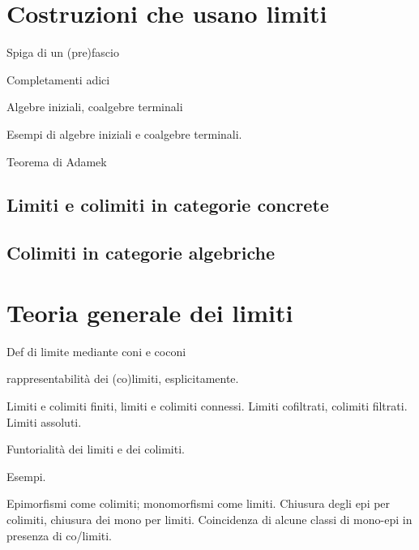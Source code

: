 \section{Costruzioni che usano limiti}
\begin{example}
	Spiga di un (pre)fascio
\end{example}
\begin{example}
	Completamenti adici
\end{example}
\begin{example}
	Algebre iniziali, coalgebre terminali
\end{example}
\begin{examples}
	Esempi di algebre iniziali e coalgebre terminali.
\end{examples}
\begin{theorem}
	Teorema di Adamek
\end{theorem}
\subsection{Limiti e colimiti in categorie concrete}
\subsection{Colimiti in categorie algebriche}
\begin{esercizi}
	\item
	\item
	\item
	\item
	\item
\end{esercizi}

\section{Teoria generale dei limiti}

Def di limite mediante coni e coconi

rappresentabilità dei (co)limiti, esplicitamente.

Limiti e colimiti finiti, limiti e colimiti connessi.
Limiti cofiltrati, colimiti filtrati.
Limiti assoluti.

Funtorialità dei limiti e dei colimiti.

Esempi.

Epimorfismi come colimiti; monomorfismi come limiti. Chiusura degli epi per colimiti, chiusura dei mono per limiti. Coincidenza di alcune classi di mono-epi in presenza di co/limiti.

